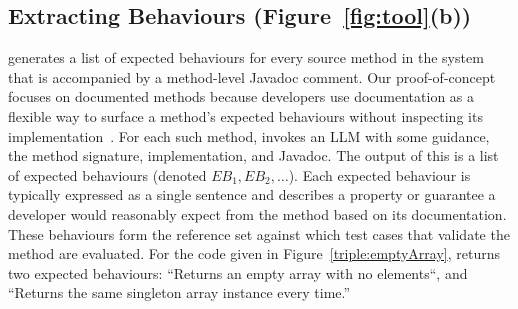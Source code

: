 
\subsection{Extracting Behaviours (Figure~\ref{fig:tool}(b))} 
\label{sec:approach:behaviours}

\toolname{} generates a list of expected behaviours for every source method in the system that is accompanied by a method-level Javadoc comment.
Our proof-of-concept focuses on documented methods because developers use documentation as a flexible way to surface a method's expected behaviours without inspecting its implementation~\cite{hossain2025doc2oracllinvestigatingimpactdocumentation}.
For each such method, \toolname invokes an LLM with some guidance, the method signature, implementation, and Javadoc. 
%
The output of this is a list of expected behaviours (denoted $EB_1, EB_2,\dotsc$). Each expected behaviour is typically expressed as a single sentence and describes a property or guarantee a developer would reasonably expect from the method based on its documentation. 
These behaviours form the reference set against which test cases that validate the method are evaluated. 
For the code given in Figure~\ref{triple:emptyArray}, \toolname{} returns two expected behaviours: ``Returns an empty array with no elements``, and ``Returns the 
same singleton array instance every time.'' 

